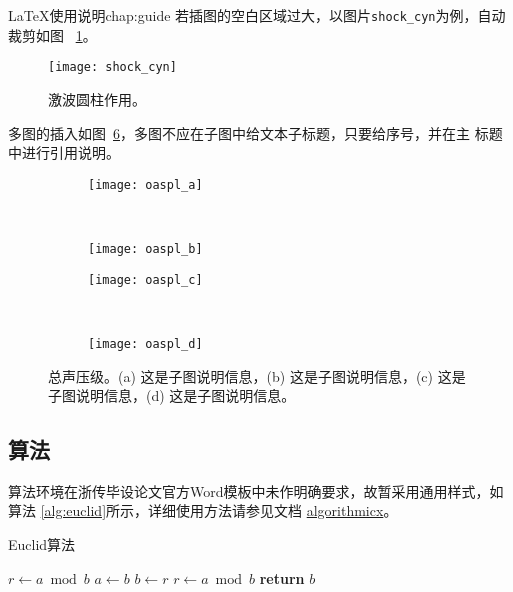 \begin{cuzchapter}{\LaTeX{}使用说明}{chap:guide}
    若插图的空白区域过大，以图片\verb|shock_cyn|为例，自动裁剪如图
    ~\ref{fig:shock_cyn}。
    \begin{figure}[h]
        \centering
        \texttt{[image: shock\_cyn]}
        \caption[激波圆柱作用]{激波圆柱作用。}
        \label{fig:shock_cyn}
    \end{figure}

    多图的插入如图~\ref{fig:oaspl}，多图不应在子图中给文本子标题，只要给序号，并在主
    标题中进行引用说明。
    \begin{figure}[h]
        \centering
        \begin{subfigure}[b]{0.35\textwidth}
            \texttt{[image: oaspl\_a]}
            \caption{}
            \label{fig:oaspl_a}
        \end{subfigure}%
        ~%
        \begin{subfigure}[b]{0.35\textwidth}
            \texttt{[image: oaspl\_b]}
            \caption{}
            \label{fig:oaspl_b}
        \end{subfigure}
        \begin{subfigure}[b]{0.35\textwidth}
            \texttt{[image: oaspl\_c]}
            \caption{}
            \label{fig:oaspl_c}
        \end{subfigure}%
        ~%
        \begin{subfigure}[b]{0.35\textwidth}
            \texttt{[image: oaspl\_d]}
            \caption{}
            \label{fig:oaspl_d}
        \end{subfigure}
        \caption[总声压级]{总声压级。(a) 这是子图说明信息，(b) 这是子图说明信息，(c) 这是子图说明信息，(d) 这是子图说明信息。}
        \label{fig:oaspl}
    \end{figure}

    \subsection{算法}\label{sub:algorithms}

    算法环境在浙传毕设论文官方Word模板中未作明确要求，故暂采用通用样式，如算法
    \ref{alg:euclid}所示，详细使用方法请参见文档
    \href{https://ctan.org/pkg/algorithmicx?lang=en}{algorithmicx}。

    \begin{algorithm}[h]
        \small
        \caption{Euclid算法}\label{alg:euclid}
        \begin{algorithmic}[1]
            \State $r\gets a\bmod b$
            \State $a\gets b$
            \State $b\gets r$
            \State $r\gets a\bmod b$
            \EndWhile\label{euclidendwhile}
            \State \textbf{return} $b$
            \EndProcedure
        \end{algorithmic}
    \end{algorithm}


\end{cuzchapter}
